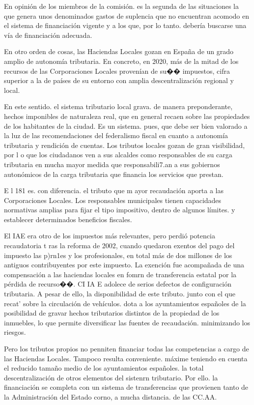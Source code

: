 \documentclass[10pt,a4paper]{article}
\begin{document}
{En opinión de los miembros de la comisión. es la segunda de las situaciones la que genera unos denominados gastos de suplencia que no encuentran acomodo en el sistema de financiación vigente y a los que, por lo tanto. debería buscarse una vía de financiación adecuada.

En otro orden de cosas, las Haciendas Locales gozan en España de un grado amplio de autonomía tributaria. En concreto, en 2020, más de la mitad de los recursos de las Corporaciones Locales provenían de su�� impuestos, cifra superior a la de países de su entorno con amplia descentralización regional y local.

En este sentido. el sistema tributario local grava. de manera preponderante, hechos imponibles de naturaleza real, que en general recaen sobre las propiedades de los habitantes de la ciudad. Es un sistema. pues, que debe ser bien valorado a la luz de las recomendaciones del federalismo fiscal en cuanto a autonomía tributaria y rendición de cuentas. Los tributos locales gozan de gran visibilidad, por l o que los ciudadanos ven a sus alcaldes como responsables de su carga tributaria en mucha mayor medida que responsabili7.an a sus gobiernos autonómicos de la carga tributaria  que financia los servicios que prestan.

E l 181 es. con diferencia. el tributo que m ayor recaudación aporta a las Corporaciones Locales. Los responsables municipales tienen capacidades normativas amplias para fijar el tipo impositivo, dentro de algunos límites. y establecer determinados beneficios fiscales.

El IAE era otro de los impuestos más relevantes, pero perdió potencia recaudatoria t ras la reforma de 2002, cuando quedaron exentos del pago del impuesto las p)rn1es y los profesionales, en total más de dos millones de los antiguos contribuyentes por este impuesto. La exención fue acompañada de una compensación a las haciendas locales en fomrn de transferencia estatal por la pérdida de recurso��. CI IA E adolece de serios defectos de configuración tributaria. A pesar de ello, la disponibilidad de este tributo. junto con el que recat' sobre la circulación de vehículos. dota a los ayuntamientos españoles de la posibilidad de gravar hechos tributarios distintos de la propiedad de los inmuebles, lo que permite diversificar las fuentes de recaudación. minimizando los riesgos.

Pero los tributos propios no penniten financiar todas las competencias a cargo de las Haciendas Locales. Tampoco resulta conveniente. máxime teniendo en cuenta el reducido tamaño medio de los ayuntamientos españoles. la total descentralización de otros elementos del sistenrn tributario. Por ello. la financiación se completa con un sistema de transferencias que provienen tanto de la Administración del Estado corno, a mucha distancia. de las CC.AA.

}
\end{document}
